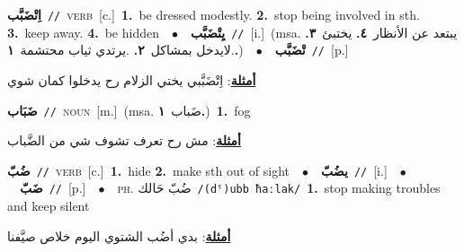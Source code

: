 \documentclass[10pt,a4paper,twoside]{article} %
\begin{document}
\begin{multicols}{2}
{{\setlength\topsep{0pt}\textbf{\foreignlanguage{arabic}{اِتْضَبَّب}}\ {\color{gray}\texttt{//}\color{black}}\ \textsc{verb}\ [c.]\ \textbf{1.}~be dressed modestly.  \textbf{2.}~stop being involved in sth.  \textbf{3.}~keep away.  \textbf{4.}~be hidden\ \ $\bullet$\ \ \setlength\topsep{0pt}\textbf{\foreignlanguage{arabic}{يِتْضَبَّب}}\ {\color{gray}\texttt{//}\color{black}}\ [i.]\ \color{gray}(msa. \foreignlanguage{arabic}{يبتعد عن الأنظار}~\foreignlanguage{arabic}{\textbf{٤.}}  \foreignlanguage{arabic}{يختبئ}~\foreignlanguage{arabic}{\textbf{٣.}}  .\foreignlanguage{arabic}{لايدخل بمشاكل}~\foreignlanguage{arabic}{\textbf{٢.}}  .\foreignlanguage{arabic}{يرتدي ثياب محتشمة}~\foreignlanguage{arabic}{\textbf{١.}})\color{black}\ \ $\bullet$\ \ \setlength\topsep{0pt}\textbf{\foreignlanguage{arabic}{تْضَبَّب}}\ {\color{gray}\texttt{//}\color{black}}\ [p.]\  \begin{flushright}\color{gray}\foreignlanguage{arabic}{\textbf{\underline{\foreignlanguage{arabic}{أمثلة}}}: اِتْضَبَّبي يختي الزلام رح يدخلوا كمان شوي}\end{flushright}\color{black}} \vspace{2mm}

{\setlength\topsep{0pt}\textbf{\foreignlanguage{arabic}{ضَبَاب}}\ {\color{gray}\texttt{//}\color{black}}\ \textsc{noun}\ [m.]\ \color{gray}(msa. \foreignlanguage{arabic}{ضَباب}~\foreignlanguage{arabic}{\textbf{١.}})\color{black}\ \textbf{1.}~fog\  \begin{flushright}\color{gray}\foreignlanguage{arabic}{\textbf{\underline{\foreignlanguage{arabic}{أمثلة}}}: مش رح تعرف تشوف شي من الضَّباب}\end{flushright}\color{black}} \vspace{2mm}

{\setlength\topsep{0pt}\textbf{\foreignlanguage{arabic}{ضُبّ}}\ {\color{gray}\texttt{//}\color{black}}\ \textsc{verb}\ [c.]\ \textbf{1.}~hide  \textbf{2.}~make sth out of sight\ \ $\bullet$\ \ \setlength\topsep{0pt}\textbf{\foreignlanguage{arabic}{يضُبّ}}\ {\color{gray}\texttt{//}\color{black}}\ [i.]\ \ $\bullet$\ \ \setlength\topsep{0pt}\textbf{\foreignlanguage{arabic}{ضَبّ}}\ {\color{gray}\texttt{//}\color{black}}\ [p.]\ \ $\bullet$\ \ \textsc{ph.} \color{gray} \foreignlanguage{arabic}{ضُبّ حَالك}\color{black}\ {\color{gray}\texttt{/{\sffamily (dˤ)ubb ħaːlak}/}\color{black}}\ \textbf{1.}~stop making troubles and keep silent\  \begin{flushright}\color{gray}\foreignlanguage{arabic}{\textbf{\underline{\foreignlanguage{arabic}{أمثلة}}}: بدي أضُب الشتوي اليوم خلاص صيَّفنا}\end{flushright}\color{black}} \vspace{2mm}

}
\end{multicols}
\end{document}
